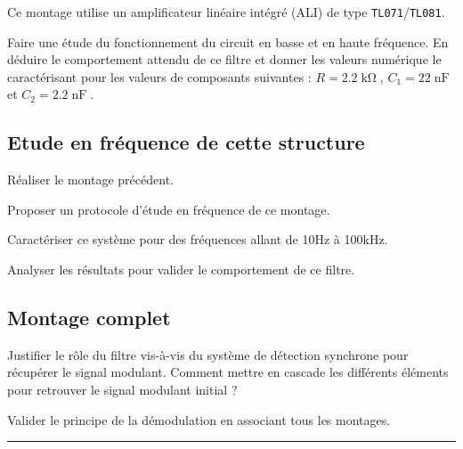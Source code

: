 \documentclass[a4paper,11pt]{article}
\begin{document}
Ce montage utilise un amplificateur linéaire intégré (ALI) de type \texttt{TL071}/\texttt{TL081}.

\Real Faire une étude du fonctionnement du circuit en basse et en haute fréquence. En déduire le comportement attendu de ce filtre et donner les valeurs numérique le caractérisant pour les valeurs de composants
suivantes : $R = 2.2\operatorname{k\Omega}$, $C_1 = 22\operatorname{nF}$ et $C_2 = 2.2\operatorname{nF}$.

\subsection*{Etude en fréquence de cette structure}

\Real Réaliser le montage précédent. 

\Real Proposer un protocole d'étude en fréquence de ce montage.

\Real Caractériser ce système pour des fréquences allant de 10Hz à 100kHz.

\Real Analyser les résultats pour valider le comportement de ce filtre.


\subsection*{Montage complet}

\Real Justifier le rôle du filtre vis-à-vis du système de détection synchrone pour récupérer le signal modulant. Comment mettre en cascade les différents éléments pour retrouver le signal modulant initial ?

\Real Valider le principe de la démodulation en associant tous les montages.




\noindent \rule{\linewidth}{1pt}




\end{document}
